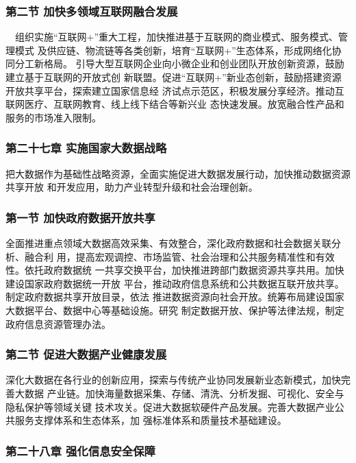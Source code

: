 \documentclass[11pt]{ctexart}
\begin{document}
{{{{\subsubsection{第二节 加快多领域互联网融合发展 }
\label{sec:org31cca2e}

  组织实施“互联网+”重大工程，加快推进基于互联网的商业模式、服务模式、管理模式
及供应链、物流链等各类创新，培育“互联网+”生态体系，形成网络化协同分工新格局。
引导大型互联网企业向小微企业和创业团队开放创新资源，鼓励建立基于互联网的开放式创
新联盟。促进“互联网+”新业态创新，鼓励搭建资源开放共享平台，探索建立国家信息经
济试点示范区，积极发展分享经济。推动互联网医疗、互联网教育、线上线下结合等新兴业
态快速发展。放宽融合性产品和服务的市场准入限制。 

\subsubsection{第二十七章 实施国家大数据战略}
\label{sec:org81c56a2}

把大数据作为基础性战略资源，全面实施促进大数据发展行动，加快推动数据资源共享开放
和开发应用，助力产业转型升级和社会治理创新。

\subsubsection{第一节 加快政府数据开放共享}
\label{sec:org866052b}

全面推进重点领域大数据高效采集、有效整合，深化政府数据和社会数据关联分析、融合利
用，提高宏观调控、市场监管、社会治理和公共服务精准性和有效性。依托政府数据统
一共享交换平台，加快推进跨部门数据资源共享共用。加快建设国家政府数据统一开放
平台，推动政府信息系统和公共数据互联开放共享。制定政府数据共享开放目录，依法
推进数据资源向社会开放。统筹布局建设国家大数据平台、数据中心等基础设施。研究
制定数据开放、保护等法律法规，制定政府信息资源管理办法。

\subsubsection{第二节 促进大数据产业健康发展}
\label{sec:orgf5403b3}

深化大数据在各行业的创新应用，探索与传统产业协同发展新业态新模式，加快完善大数据
产业链。加快海量数据采集、存储、清洗、分析发掘、可视化、安全与隐私保护等领域关键
技术攻关。促进大数据软硬件产品发展。完善大数据产业公共服务支撑体系和生态体系，加
强标准体系和质量技术基础建设。

\subsubsection{第二十八章 强化信息安全保障}
\label{sec:orgbe81cec}

}}}}
\end{document}
